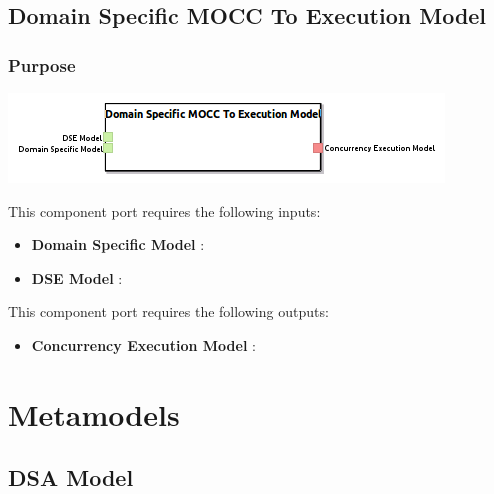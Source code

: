 \documentclass{gemoc} %
\begin{document}
\subsection{Domain Specific MOCC To Execution Model}


\subsubsection{Purpose}

\begin{center}
\includegraphics*[trim=0.0cm 0.0cm 0cm 0.0cm, clip=true]{../images/generated/Generated_Domain_Specific_MOCC_To_Execution_Model.png}
\end{center}

This component port requires the following inputs:
\begin{itemize}
  \item \textbf{Domain Specific Model} :
  \item \textbf{DSE Model} :
\end{itemize}

This component port requires the following outputs:
\begin{itemize}
  \item \textbf{Concurrency Execution Model} :
\end{itemize}

\section{Metamodels}
\subsection{DSA Model}
\end{document}
